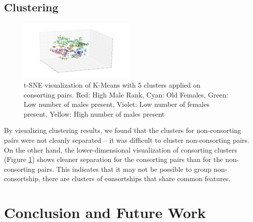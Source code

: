 \documentclass[twoside,twocolumn,paper=letter,fontsize=11pt]{article}
\begin{document}
\subsection{Clustering}
\begin{figure}[h]
      \centering
          \includegraphics[width=0.5\textwidth]{../figs/consort_kmeans_5_3d_tsne.png}
  \caption{t-SNE visualization of K-Means with 5 clusters applied on consorting
  pairs. Red: High Male Rank, Cyan: Old Females, Green: Low number of males
present, Violet: Low number of females present, Yellow: High number of males
present}
  \label{fig:consort_clustering_vis}
\end{figure}

By visualizing clustering results, we found that the clusters for non-consorting
pairs were not cleanly separated -- it was difficult to cluster non-consorting
pairs. On the other hand, the lower-dimensional visualization of consorting
clusters  (Figure \ref{fig:consort_clustering_vis}) shows cleaner separation for
the consorting pairs than for the non-consorting pairs. This indicates that it
may not be possible to group non-consortship, there are clusters of consortships
that share common features.


\section{Conclusion and Future Work}
\end{document}
